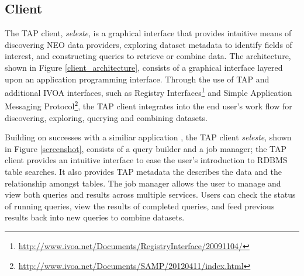
\subsection{Client}
The TAP client, \textit{seleste}, is a graphical interface that provides intuitive means of discovering NEO data providers, exploring dataset metadata to identify fields of interest, and constructing queries to retrieve or combine data.  The architecture, shown in Figure \ref{client_architecture}, consists of a graphical interface layered upon an application programming interface.  Through the use of TAP and additional IVOA interfaces, such as Registry Interfaces\footnote{\url{http://www.ivoa.net/Documents/RegistryInterface/20091104/}} and Simple Application Messaging Protocol\footnote{\url{http://www.ivoa.net/Documents/SAMP/20120411/index.html}}, the TAP client integrates into the end user's work flow for discovering, exploring, querying and combining datasets.

Building on successes with a similiar application \citep{cscview}, the TAP client \textit{seleste}, shown in Figure \ref{screenshot}, consists of a query builder and a job manager; the TAP client provides an intuitive interface to ease the user's introduction to RDBMS table searches.  It also provides TAP metadata the describes the data and the relationship amongst tables.  The job manager allows the user to manage and view both queries and results across multiple services.  Users can check the status of running queries, view the results of completed queries, and feed previous results back into new queries to combine datasets. 


